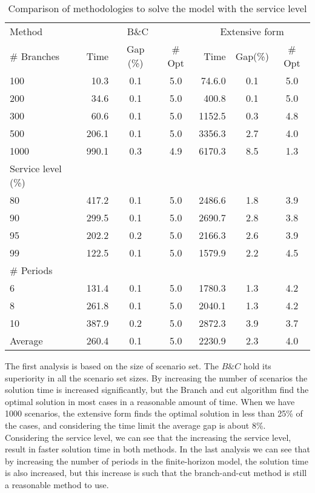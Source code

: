\documentclass[10pt]{article}
\begin{document}
\begin{table}[H]
\centering
\caption{Comparison of methodologies to solve the model with the service level}
\label{tab:MethodologyCompare}
\begin{tabular}{lrccrcc}
\toprule
Method      & \multicolumn{3}{c}{ B\&C} &  \multicolumn{3}{c}{Extensive form} \\
\# Branches & Time       & Gap (\%)       & \# Opt      & Time    & Gap(\%)     & \# Opt   \\
\cmidrule(lr){1-1}
\cmidrule(lr){2-4}
\cmidrule(lr){5-7}
100	&	10.3	&	0.1	&	5.0	&	74.6.0	&	0.1	&	5.0	\\
200	&	34.6	&	0.1	&	5.0	&	400.8	&	0.1	&	5.0	\\
300	&	60.6	&	0.1	&	5.0	&		1152.5	&	0.3	&	4.8	\\
500	&	206.1	&	0.1	&	5.0	&	3356.3	&	2.7	&	4.0	\\
1000	&	990.1	&	0.3	&	4.9	&	6170.3	&	8.5	&	1.3	\\
\midrule
Service level (\%) &&&&&&\\
80&	417.2	&	0.1	&	5.0	&		2486.6	&	1.8	&	3.9	\\
90&	299.5	&	0.1	&	5.0	&	2690.7	&	2.8	&	3.8	\\
95&	202.2	&	0.2	&	5.0	&	2166.3	&	2.6	&	3.9	\\
99&	122.5	&	0.1	&	5.0	&	1579.9	&	2.2	&	4.5	\\
\midrule
\# Periods &&&&&&\\
6	&	131.4	&	0.1	&	5.0	&		1780.3	&	1.3	&	4.2	\\
8	&	261.8	&	0.1	&	5.0	&	2040.1	&	1.3	&	4.2	\\
10	&	387.9	&	0.2	&	5.0	&		2872.3	&	3.9	&	3.7	\\
\midrule
Average &	260.4	&	0.1	&	5.0	&		2230.9	&	2.3	&	4.0	\\
\bottomrule
\end{tabular}

\end{table}

The first analysis is based on the size of scenario set. The $B \& C$ hold its superiority in all the scenario set sizes. By increasing the number of scenarios the solution time is increased significantly, but the Branch and cut algorithm find the optimal solution in most cases in a reasonable amount of time. When we have 1000 scenarios, the extensive form finds the optimal solution in less than 25\% of the cases, and considering the time limit the average gap is about 8\%. Considering the service level, we can see that the increasing the service level, result in faster solution time in both methods. In the last analysis we can see that by increasing the number of periods in the finite-horizon model, the solution time is also increased, but this increase is such that the branch-and-cut method is still a reasonable method to use.
\end{document}
